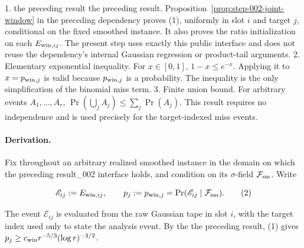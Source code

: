 1. the preceding result the preceding result. Proposition~\ref{prop:step-002-joint-window}
   in the preceding dependency proves (1), uniformly in slot \(i\) and
   target \(j\), conditional on the fixed smoothed instance. It also proves
   the ratio initialization on each \(E_{{\rm win},ij}\). The present step
   uses exactly this public interface and does not reuse the dependency's
   internal Gaussian regression or product-tail arguments.
2. Elementary exponential inequality. For \(x\in[0,1]\),
   \(1-x\le e^{-x}\). Applying it to \(x=p_{{\rm win},j}\) is valid because
   \(p_{{\rm win},j}\) is a probability. The inequality is the only
   simplification of the binomial miss term.
3. Finite union bound. For arbitrary events \(A_1,\ldots,A_r\),
   \(\Pr(\bigcup_jA_j)\le\sum_j\Pr(A_j)\). This result requires no
   independence and is used precisely for the target-indexed miss events.

\paragraph{Derivation.}

Fix throughout an arbitrary realized smoothed instance in the domain on
which the preceding result\_002 interface holds, and condition on its
\(\sigma\)-field \(\mathcal F_{\rm sm}\). Write

\[
\mathscr E_{ij}:=E_{{\rm win},ij},\qquad
p_j:=p_{{\rm win},j}=\Pr(\mathscr E_{ij}\mid\mathcal F_{\rm sm}).
\tag{2}
\]

The event \(\mathscr E_{ij}\) is evaluated from the raw Gaussian tape in slot
\(i\), with the target index used only to state the analysis event. By the
the preceding result, (1) gives \(p_j\ge c_{\rm win}r^{-5/3}(\log r)^{-3/2}\).


